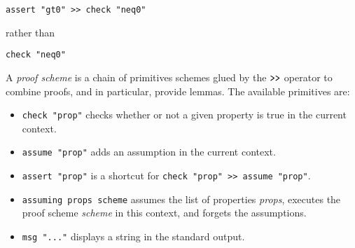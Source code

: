 \begin{lstlisting}[frame=single]
assert "gt0" >> check "neq0"
\end{lstlisting}

\noindent
rather than
\begin{lstlisting}[frame=single] 
  check "neq0" 
\end{lstlisting}
A \emph{proof scheme} is a chain of
primitives schemes glued by the $\texttt{\textgreater{}\textgreater{}}$
operator to combine proofs, and in particular, provide lemmas. The available primitives are:

\begin{itemize}
\itemsep1pt\parskip0pt
\item
  \texttt{check "prop"} checks whether or not a given property is true
  in the current context.
\item
  \texttt{assume "prop"} adds an assumption in the current context.
\item
  \texttt{assert "prop"} is a shortcut for
  \texttt{check "prop" \textgreater{}\textgreater{} assume "prop"}.
\item

\texttt{assuming props scheme} assumes the list of
  properties \emph{props}, executes the proof scheme \emph{scheme} in
  this context, and forgets the assumptions.

\item
  \texttt{msg "..."} displays a string in the standard output.
\end{itemize}

